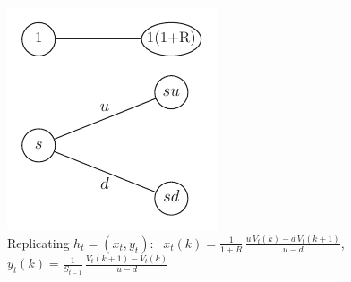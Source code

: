 \documentclass[10pt,handout]{beamer}
\theoremstyle{definition}
\begin{document}
\begin{frame}
  \begin{figure}[!htbp]
    \centering
    \includegraphics[scale=1.05,page=10]{fig/note08/bjork.pdf}
    \caption{Replicating $h_t=(x_t, y_t):\;$ $x_t(k) = \frac{1}{1+R}\,\frac{u\,V_t(k)-d\,V_t(k+1)}{u-d}$, $y_t(k) = \frac{1}{S_{t-1}}\,\frac{V_t(k+1)-V_t(k)}{u-d}$}
  \end{figure}
\end{frame}
\end{document}
